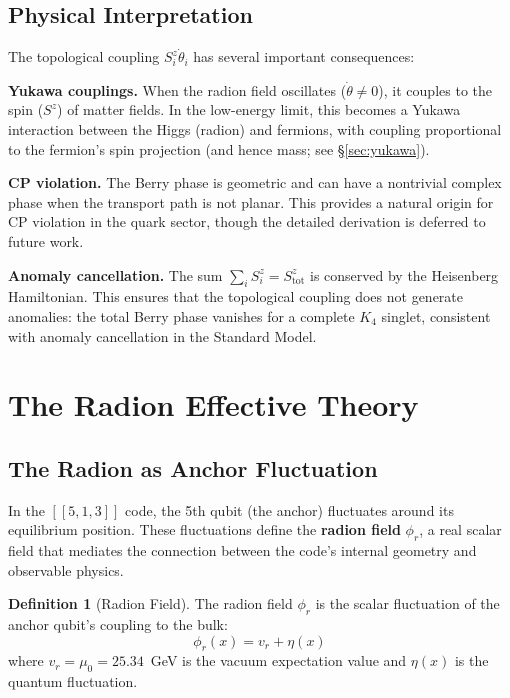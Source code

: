 \documentclass[11pt,a4paper]{article}
\theoremstyle{definition}
\newtheorem{definition}[theorem]{Definition}
\theoremstyle{remark}
\newcommand{\murad}{\mu_0}
\begin{document}
\subsection{Physical Interpretation}

The topological coupling $S_i^z\dot{\theta}_i$ has several important consequences:

\textbf{Yukawa couplings.} When the radion field oscillates ($\dot{\theta} \neq 0$), it couples to the spin ($S^z$) of matter fields. In the low-energy limit, this becomes a Yukawa interaction between the Higgs (radion) and fermions, with coupling proportional to the fermion's spin projection (and hence mass; see \S\ref{sec:yukawa}).

\textbf{CP violation.} The Berry phase is geometric and can have a nontrivial complex phase when the transport path is not planar. This provides a natural origin for CP violation in the quark sector, though the detailed derivation is deferred to future work.

\textbf{Anomaly cancellation.} The sum $\sum_i S_i^z = S_{\mathrm{tot}}^z$ is conserved by the Heisenberg Hamiltonian. This ensures that the topological coupling does not generate anomalies: the total Berry phase vanishes for a complete $K_4$ singlet, consistent with anomaly cancellation in the Standard Model.

\section{The Radion Effective Theory}
\label{sec:radion}

\subsection{The Radion as Anchor Fluctuation}

In the $[[5,1,3]]$ code, the 5th qubit (the anchor) fluctuates around its equilibrium position. These fluctuations define the \textbf{radion field} $\phi_r$, a real scalar field that mediates the connection between the code's internal geometry and observable physics.

\begin{definition}[Radion Field]
\label{def:radion}
The radion field $\phi_r$ is the scalar fluctuation of the anchor qubit's coupling to the bulk:
\begin{equation}
\phi_r(x) = v_r + \eta(x)
\end{equation}
where $v_r = \murad = 25.34$~GeV is the vacuum expectation value and $\eta(x)$ is the quantum fluctuation.
\end{definition}
\end{document}
